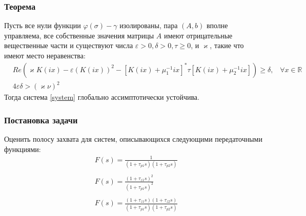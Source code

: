 \documentclass{beamer}
\begin{document}
\begin{frame}
\frametitle{Теорема}
\begin{theorem}\label{th1}
Пусть все нули функции $\varphi(\sigma) - \gamma$ изолированы, пара $(A, b)$ вполне управляема, все собственные значения матрицы $A$ имеют отрицательные вещественные части и существуют числа $\varepsilon > 0, \delta > 0, \tau \geq 0$, и $\varkappa$, такие что имеют место неравенства:
 \begin{align}
&Re(\varkappa K(ix)- \varepsilon(K(ix))^2-[K(ix)+\mu_1^{-1}ix]^*\tau[K(ix)+\mu_2^{-1}ix])\geq\delta\text{,}\quad \forall x \in \mathbb{R}\label{first_th_eq}\\
&4\varepsilon\delta > (\varkappa\nu)^2
\end{align}
Тогда система \eqref{system} глобально ассимптотически устойчива.
\end{theorem}
\end{frame}

\begin{frame}
\frametitle{Постановка задачи}
Оценить полосу захвата для систем, описывающихся следующими передаточными функциями:
 \begin{equation*}
 \begin{aligned}
&F(s) = \frac{1}{(1+\tau_{p1}s)(1+\tau_{p2}s)}\\
&\\
&F(s) = \frac{(1+\tau_{z1}s)^2}{(1+\tau_{p1}s)^2}\\
&\\
&F(s) = \frac{(1+\tau_{z1}s)(1+\tau_{z2}s)}{(1+\tau_{p1}s)(1+\tau_{p2}s)}
 \end{aligned}
\end{equation*}
\end{frame}

\end{document}
